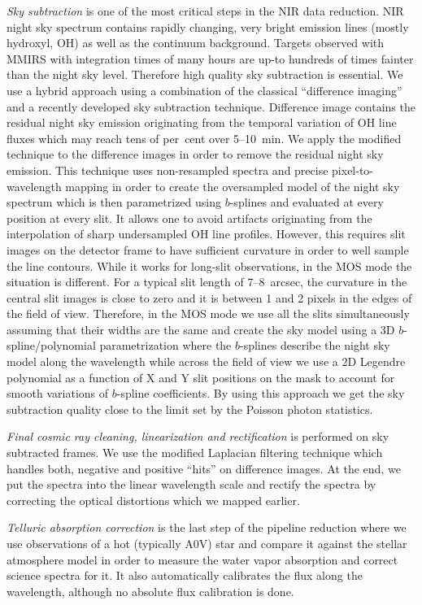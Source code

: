  \emph{Sky subtraction} is one of the most critical steps in the NIR data
reduction.  NIR night sky spectrum contains rapidly changing, very bright
emission lines (mostly hydroxyl, OH) as well as the continuum background. 
Targets observed with MMIRS with integration times of many hours are up-to
hundreds of times fainter than the night sky level.  Therefore high quality
sky subtraction is essential.  We use a hybrid approach using a combination
of the classical ``difference imaging'' and a recently developed sky
subtraction technique.  Difference image contains the residual night sky
emission originating from the temporal variation of OH line fluxes which may
reach tens of per~cent over 5--10~min.  We apply the modified
\citet{Kelson03} technique to the difference images in order to remove the
residual night sky emission.  This technique uses non-resampled spectra and
precise pixel-to-wavelength mapping in order to create the oversampled model
of the night sky spectrum which is then parametrized using $b$-splines and
evaluated at every position at every slit.  It allows one to avoid artifacts
originating from the interpolation of sharp undersampled OH line profiles. 
However, this requires slit images on the detector frame to have sufficient
curvature in order to well sample the line contours.  While it works for
long-slit observations, in the MOS mode the situation is different.  For a
typical slit length of 7--8~arcsec, the curvature in the central slit images
is close to zero and it is between 1 and 2 pixels in the edges of the field
of view.  Therefore, in the MOS mode we use all the slits simultaneously
assuming that their widths are the same and create the sky model using a 3D
$b$-spline/polynomial parametrization where the $b$-splines describe the
night sky model along the wavelength while across the field of view we use a
2D Legendre polynomial as a function of X and Y slit positions on the mask
to account for smooth variations of $b$-spline coefficients.  By using this
approach we get the sky subtraction quality close to the limit set by the
Poisson photon statistics.

\emph{Final cosmic ray cleaning, linearization and rectification} is
performed on sky subtracted frames.  We use the modified Laplacian filtering
technique \citep{vanDokkum01} which handles both, negative and positive
``hits'' on difference images.  At the end, we put the spectra into the
linear wavelength scale and rectify the spectra by correcting the optical
distortions which we mapped earlier.

\emph{Telluric absorption correction} is the last step of the pipeline
reduction where we use observations of a hot (typically A0V) star and
compare it against the stellar atmosphere model in order to measure the water
vapor absorption and correct science spectra for it. It also automatically
calibrates the flux along the wavelength, although no absolute flux
calibration is done.

